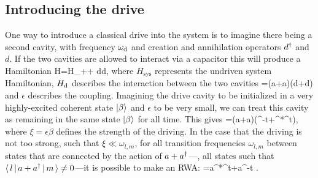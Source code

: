 \subsection{Introducing the drive}
One way to introduce a classical drive into the system is to imagine there being a second cavity, with frequency $\omega_{\text{d}}$ and creation and annihilation operators $d^{\dag}$ and $d$. If the two cavities are allowed to interact via a capacitor this will produce a Hamiltonian
\be
    \label{eq:drive}
    H=H_+\Hd + \omd d\dg d,
\ee%
%
where $H_\text{sys}$ represents the undriven system Hamiltonian, ${H}_{\text{d}}$ describes the interaction between the two cavities
\be
    \Hd=\epsilon \bigl(a+a\dg\bigr)\bigl(d+d\dg\bigr)
\ee
and $\epsilon$ describes the coupling. Imagining the drive cavity to be initialized in a very highly-excited coherent state $\left\lvert \beta \right\rangle$ and $\epsilon$ to be very small, we can treat this cavity as remaining in the same state $\left\lvert \beta \right\rangle$ for all time. This gives
\be
    \label{eq:driveclassic}
    \Hd=\bigl(a+a\dg\bigr)\bigl(\xi\rme^{-\rmi \omd t}+\xi^*\rme^{\rmi \omd t}\bigr),
\ee%
%
where $\xi=\epsilon\beta$ defines the strength of the driving. In the case that the driving is not too strong, such that $\xi\ll\omega_{l,m}$, for all transition frequencies $\omega_{l,m}$ between states that are connected by the action of $a+a^{\dag}$---\ie, all states such that $\langle\, l \,|\, a+a^{\dag} \,|\, m \,\rangle\ne0$---it is possible to make an RWA:
\be
    \label{eq:HdRWA}
    \Hd=a\xi^*\rme^{\rmi \omd t}+a\dg\xi\rme^{-\rmi\omd t} .
\ee

